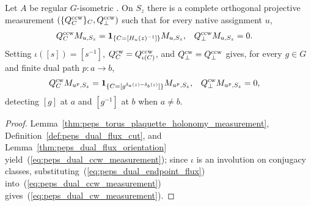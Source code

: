 \begin{lemma}%
    \label{thm:peps_dual_flux_detection}
    \leanok
    Let $A$ be regular $G$-isometric \cite[Theorem~6.15]{Schuch2010PEPS}. On
    $S_z$ there is a complete orthogonal projective measurement
    $(\{Q_C^{\rm ccw}\}_C,Q_\perp^{\rm ccw})$ such that for every native
    assignment $u$,
    \begin{align}
        Q_C^{\rm ccw}M_{u,S_z}                   & =
        \mathbf1_{\{C=[H_u(z)^{-1}]\}}M_{u,S_z}, &
        Q_\perp^{\rm ccw}M_{u,S_z}               & =0.
        \label{eq:peps_dual_ccw_measurement}
    \end{align}
    Setting $\iota([s])=[s^{-1}]$, $Q_C^{\rm cw}=Q_{\iota(C)}^{\rm ccw}$, and
    $Q_\perp^{\rm cw}=Q_\perp^{\rm ccw}$ gives, for every $g\in G$ and finite
    dual path $p:a\to b$,
    \begin{align}
        Q_C^{\rm cw}M_{u^p,S_z}                                    & =
        \mathbf1_{\{C=[g^{\delta_a(z)-\delta_b(z)}]\}}M_{u^p,S_z}, &
        Q_\perp^{\rm cw}M_{u^p,S_z}                                & =0,
        \label{eq:peps_dual_cw_measurement}
    \end{align}
    detecting $[g]$ at $a$ and $[g^{-1}]$ at $b$ when $a\ne b$.
\end{lemma}
\begin{proof}\leanok
    Lemma~\ref{thm:peps_torus_plaquette_holonomy_measurement},
    Definition~\ref{def:peps_dual_flux_cut}, and
    Lemma~\ref{thm:peps_dual_flux_orientation} yield~(\ref{eq:peps_dual_ccw_measurement});
    since $\iota$ is an involution on conjugacy classes, substituting~(\ref{eq:peps_dual_endpoint_flux})
    into~(\ref{eq:peps_dual_ccw_measurement}) gives~(\ref{eq:peps_dual_cw_measurement}).
\end{proof}

